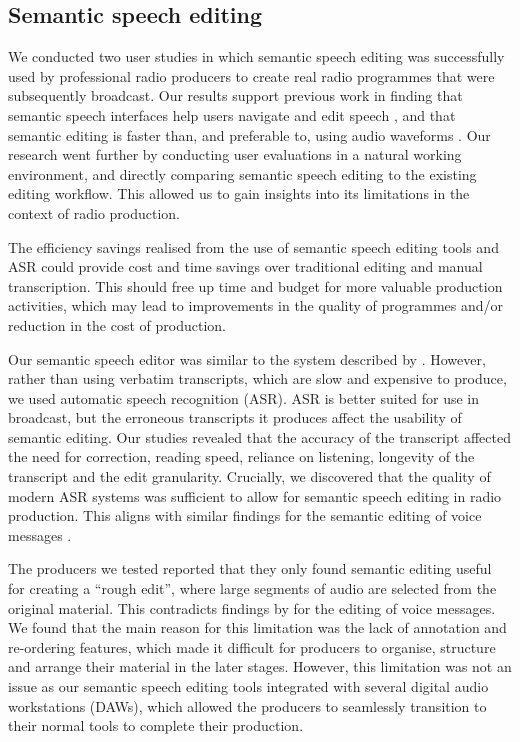 \subsection{Semantic speech editing}

We conducted two user studies in which semantic speech editing was successfully used by professional radio producers to
create real radio programmes that were subsequently broadcast. Our results support previous work in finding that
semantic speech interfaces help users navigate and edit speech \citep{Whittaker2002}, and that semantic editing is
faster than, and preferable to, using audio waveforms \citep{Whittaker2004,Sivaraman2016}. Our research went further by
conducting user evaluations in a natural working environment, and directly comparing semantic speech editing to the
existing editing workflow. This allowed us to gain insights into its limitations in the context of radio production.

The efficiency savings realised from the use of semantic speech editing tools and ASR could provide cost and time
savings over traditional editing and manual transcription.  This should free up time and budget for more valuable
production activities, which may lead to improvements in the quality of programmes and/or reduction in the cost of
production.

Our semantic speech editor was similar to the system described by \citet{Rubin2013}. However, rather than using
verbatim transcripts, which are slow and expensive to produce, we used automatic speech recognition (ASR). ASR is
better suited for use in broadcast, but the erroneous transcripts it produces affect the usability of semantic editing.
Our studies revealed that the accuracy of the transcript affected the need for correction, reading speed, reliance on
listening, longevity of the transcript and the edit granularity.  Crucially, we discovered that the quality of 
modern ASR systems was sufficient to allow for semantic speech editing in radio production.  This aligns with similar
findings for the semantic editing of voice messages \citep{Whittaker2004,Sivaraman2016}.

The producers we tested reported that they only found semantic editing useful for creating a ``rough edit'', where
large segments of audio are selected from the original material. This contradicts findings by \citet{Sivaraman2016} for
the editing of voice messages.
We found that the main reason for this limitation was the lack of annotation and re-ordering features, which made it
difficult for producers to organise, structure and arrange their material in the later stages.  However, this
limitation was not an issue as our semantic speech editing tools integrated with several digital audio workstations
(DAWs), which allowed the producers to seamlessly transition to their normal tools to complete their production.

